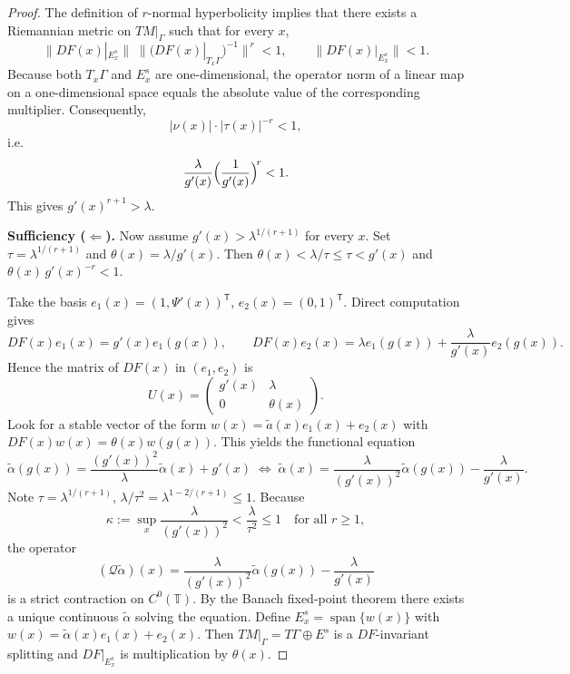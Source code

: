 \documentclass[10pt,a4paper]{amsart}
\begin{document}
\begin{proof}
\medskip

The definition of $r$-normal hyperbolicity  implies that there exists a
Riemannian metric on $TM|_\Gamma$ such that for every $x$,
\[
\|DF(x)|_{E^s_x}\| \; \bigl\|(DF(x)|_{T_x\Gamma})^{-1}\bigr\|^{\,r} < 1,
\qquad
\|DF(x)|_{E^s_x}\| < 1.
\]
Because both $T_x\Gamma$ and $E^s_x$ are one-dimensional, the operator norm of a linear
map on a one-dimensional space equals the absolute value of the corresponding multiplier.
Consequently,
\[
|\nu(x)| \cdot |\tau(x)|^{-r} < 1,
\]
i.e.\
\[
\frac{\lambda}{g'(x)} \Bigl(\frac{1}{g'(x)}\Bigr)^{\!r} < 1.
\]
This gives $g'(x)^{r+1} > \lambda$.

		
		\medskip
		\noindent\textbf{Sufficiency ($\Leftarrow$).}
		Now assume $g'(x)>\lambda^{1/(r+1)}$ for every $x$.
		Set $\tau=\lambda^{1/(r+1)}$ and $\theta(x)=\lambda/g'(x)$. Then
		$\theta(x)<\lambda/\tau\le \tau< g'(x)$ and $\theta(x)\,g'(x)^{-r}<1$.
		
		\medskip
	
		Take the basis $e_1(x)=(1,\Psi'(x))^{\mathsf{T}}$, $e_2(x)=(0,1)^{\mathsf{T}}$.
		Direct computation gives
		\[
		DF(x)e_1(x)=g'(x)e_1(g(x)),\qquad
		DF(x)e_2(x)=\lambda e_1(g(x))+\frac{\lambda}{g'(x)}e_2(g(x)).
		\]
		Hence the matrix of $DF(x)$ in $(e_1,e_2)$ is
		\[U(x)=\begin{pmatrix} g'(x) & \lambda \\ 0 & \theta(x) \end{pmatrix}.\]
		Look for a stable vector of the form $w(x)=\tilde a(x)e_1(x)+e_2(x)$ with
		$DF(x)w(x)=\theta(x)w(g(x))$. This yields the functional equation
		\[
		\tilde \alpha(g(x))=\frac{(g'(x))^2}{\lambda}\tilde \alpha(x)+g'(x)
		\;\Longleftrightarrow\;
		\tilde \alpha(x)=\frac{\lambda}{(g'(x))^2}\tilde \alpha(g(x))-\frac{\lambda}{g'(x)}.
		\]
		Note $\tau=\lambda^{1/(r+1)}$, $\lambda/\tau^2=\lambda^{1-2/(r+1)}\le1$. Because \[\displaystyle\kappa:=\sup_x\frac{\lambda}{(g'(x))^2}
		<\frac{\lambda}{\tau^2}\le1 \quad \text{for all } r\ge 1, \]
		the operator
		\[(\mathcal{Q}\tilde{\alpha})(x)=\frac{\lambda}{(g'(x))^2}\tilde{\alpha}(g(x))-\frac{\lambda}{g'(x)}\]
		is a strict contraction on $C^0(\mathbb{T})$.
		By the Banach fixed-point theorem there exists a unique continuous $\tilde \alpha$
		solving the equation.
		Define $E^s_x=\operatorname{span}\{w(x)\}$ with $w(x)=\tilde \alpha(x)e_1(x)+e_2(x)$.
		Then $TM|_\Gamma=T\Gamma\oplus E^s$ is a $DF$-invariant splitting and
		$DF|_{E^s_x}$ is multiplication by $\theta(x)$.
		
		\medskip


\end{proof}
\end{document}
